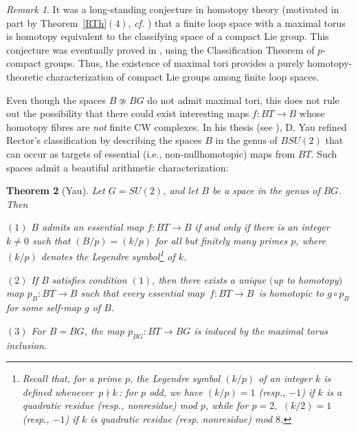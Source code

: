 \documentclass[11pt]{amsart}
\newtheorem{theorem}{Theorem}[section]
\theoremstyle{definition}
\theoremstyle{remark}
\newtheorem{remark}[theorem]{Remark}
\numberwithin{equation}{section}
\newcommand{\la}{\label}
\begin{document}
%
\begin{remark}
It was a long-standing conjecture in homotopy theory (motivated in part by Theorem~\ref{RTh}$(4)$, {\it cf.} \cite{Wil74}) that a finite loop space with a maximal torus is homotopy equivalent to the classifying space of a compact Lie group. This conjecture was eventually proved in \cite{AG09}, using the Classification Theorem of $p$-compact groups. Thus, the existence of maximal tori provides a purely homotopy-theoretic characterization of compact Lie groups among finite loop spaces.
\end{remark}
%
Even though the spaces $B \not\simeq BG$ do not admit maximal tori, this does not rule out the possibility that there could exist interesting maps $ f: BT \to B $ whose homotopy fibres are {\it not} finite CW complexes. In his thesis (see \cite{DY01}), D. Yau refined Rector's classification by describing the spaces $B$ in the genus of $BSU(2)$ that can occur as targets of essential (i.e., non-nullhomotopic) maps from $BT$. Such spaces admit a beautiful arithmetic characterization: 
%
\begin{theorem}[Yau]
\la{esmap}
Let $G = SU(2)$, and  let $B$ be a space in the genus of $ BG $. Then

$(1)$ $B$ admits an essential map $ f: BT \to B $ if and only if there is an integer $k \neq 0$ such that $ (B/p)=(k/p) $ for all but finitely many primes $p$, where $(k/p)$ denotes the Legendre symbol\footnote{Recall that, for a prime $p$, the {\it Legendre symbol} $(k/p)$ of an integer $k$ is defined whenever $\,p \nmid k\,$: for $p$ odd, we have $ (k/p) = 1 $ (resp., $-1$) if $k$ is a quadratic residue (resp., nonresidue) mod $p$, while for $p=2$,  $\,(k/2) = 1 $ (resp., $-1$) if $k$ is  quadratic residue (resp. nonresidue) mod $8$.} of $k$.

$(2)$ If $B$ satisfies condition $(1)$, then there exists a unique $($up to homotopy$)$ map $p_B: BT \to B$ such that 
every essential map $\,f: BT \to B \,$ is homotopic to $ g \circ p_B $ for some self-map $g$ of $B$. 

$(3)$ For $ B = BG $, the map $ p_{BG}: BT \to BG $ is induced by the maximal torus inclusion.
\end{theorem}
%
\end{document}
